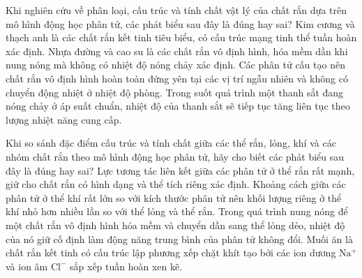 \begin{ex}
	Khi nghiên cứu về phân loại, cấu trúc và tính chất vật lý của chất rắn dựa trên mô hình động học phân tử, các phát biểu sau đây là đúng hay sai?
	\choiceTF
	{\True Kim cương và thạch anh là các chất rắn kết tinh tiêu biểu, có cấu trúc mạng tinh thể tuần hoàn xác định.}
	{\True Nhựa đường và cao su là các chất rắn vô định hình, hóa mềm dần khi nung nóng mà không có nhiệt độ nóng chảy xác định.}
	{Các phân tử cấu tạo nên chất rắn vô định hình hoàn toàn đứng yên tại các vị trí ngẫu nhiên và không có chuyển động nhiệt ở nhiệt độ phòng.}
	{Trong suốt quá trình một thanh sắt đang nóng chảy ở áp suất chuẩn, nhiệt độ của thanh sắt sẽ tiếp tục tăng liên tục theo lượng nhiệt năng cung cấp.}
\end{ex}

\begin{ex}
	Khi so sánh đặc điểm cấu trúc và tính chất giữa các thể rắn, lỏng, khí và các nhóm chất rắn theo mô hình động học phân tử, hãy cho biết các phát biểu sau đây là đúng hay sai?
	\choiceTF
	{\True Lực tương tác liên kết giữa các phân tử ở thể rắn rất mạnh, giữ cho chất rắn có hình dạng và thể tích riêng xác định.}
	{\True Khoảng cách giữa các phân tử ở thể khí rất lớn so với kích thước phân tử nên khối lượng riêng ở thể khí nhỏ hơn nhiều lần so với thể lỏng và thể rắn.}
	{Trong quá trình nung nóng để một chất rắn vô định hình hóa mềm và chuyển dần sang thể lỏng dẻo, nhiệt độ của nó giữ cố định làm động năng trung bình của phân tử không đổi.}
	{\True Muối ăn là chất rắn kết tinh có cấu trúc lập phương xếp chặt khít tạo bởi các ion dương $ \mathrm{Na^+} $ và ion âm $ \mathrm{Cl^-} $ sắp xếp tuần hoàn xen kẽ.}
\end{ex}


